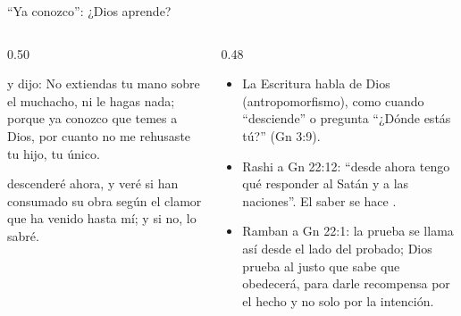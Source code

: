 \begin{frame}{``Ya conozco'': ¿Dios aprende?}
\begin{columns}[t,onlytextwidth]
\begin{column}{0.50\textwidth}
\begin{cita}y dijo: No extiendas tu mano sobre el muchacho, ni le hagas nada; porque ya conozco que temes a Dios, por cuanto no me rehusaste tu hijo, tu único.\end{cita}
\begin{cita}descenderé ahora, y veré si han consumado su obra según el clamor que ha venido hasta mí; y si no, lo sabré.\end{cita}
\end{column}
\begin{column}{0.48\textwidth}\small
\begin{itemize}
\item La Escritura habla de Dios  (antropomorfismo), como cuando ``desciende'' o pregunta ``¿Dónde estás tú?'' (Gn 3:9).
\item Rashi a Gn 22:12: ``desde ahora tengo qué responder al Satán y a las naciones''. El saber se hace .
\item Ramban a Gn 22:1: la prueba se llama así desde el lado del probado; Dios prueba al justo que sabe que obedecerá, para darle recompensa por el hecho y no solo por la intención.
\end{itemize}
\end{column}
\end{columns}\par\smallskip
{}
\end{frame}

